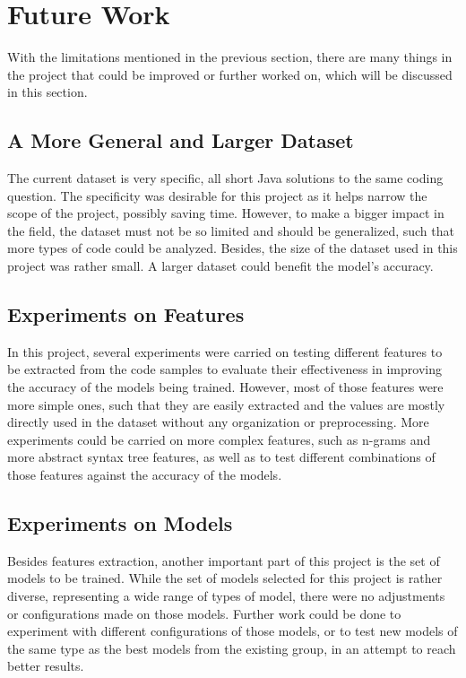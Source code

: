 \documentclass{report}
\begin{document}
\section{Future Work}

With the limitations mentioned in the previous section, there are many things in the project that could be improved or further worked on, which will be discussed in this section.

\subsection{A More General and Larger Dataset}

The current dataset is very specific, all short Java solutions to the same coding question. The specificity was desirable for this project as it helps narrow the scope of the project, possibly saving time. However, to make a bigger impact in the field, the dataset must not be so limited and should be generalized, such that more types of code could be analyzed. Besides, the size of the dataset used in this project was rather small. A larger dataset could benefit the model’s accuracy.

\subsection{Experiments on Features}

In this project, several experiments were carried on testing different features to be extracted from the code samples to evaluate their effectiveness in improving the accuracy of the models being trained. However, most of those features were more simple ones, such that they are easily extracted and the values are mostly directly used in the dataset without any organization or preprocessing. More experiments could be carried on more complex features, such as n-grams and more abstract syntax tree features, as well as to test different combinations of those features against the accuracy of the models.

\subsection{Experiments on Models}

Besides features extraction, another important part of this project is the set of models to be trained. While the set of models selected for this project is rather diverse, representing a wide range of types of model, there were no adjustments or configurations made on those models. Further work could be done to experiment with different configurations of those models, or to test new models of the same type as the best models from the existing group, in an attempt to reach better results.
\end{document}
